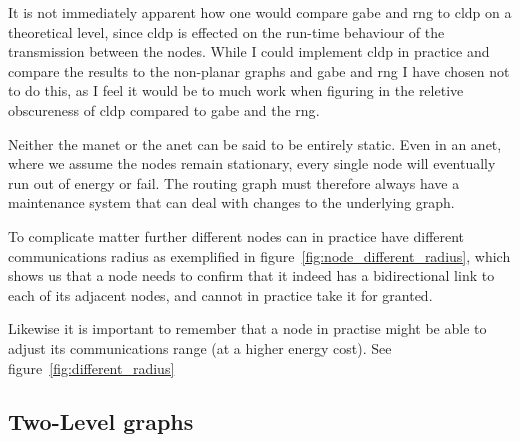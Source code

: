 
It is not immediately apparent how one would compare \ac{gabe} and \ac{rng} to \ac{cldp} on a theoretical level, since \ac{cldp} is effected on the run-time behaviour of the transmission between the nodes. While I could implement \ac{cldp} in practice and compare the results to the non-planar graphs and \ac{gabe} and \ac{rng} I have chosen not to do this, as I feel it would be to much work when figuring in the reletive obscureness of \ac{cldp} compared to \ac{gabe} and the \ac{rng}.  

Neither the \ac{manet} or the \ac{anet} can be said to be entirely static. Even in an \ac{anet}, where we assume the nodes remain stationary, every single node will eventually run out of energy or fail. The routing graph must therefore always have a maintenance system that can deal with changes to the underlying graph. 

To complicate matter further different nodes can in practice have different communications radius as exemplified in figure~\ref{fig:node_different_radius}, which shows us that a node needs to confirm that it indeed has a bidirectional link to each of its adjacent nodes, and cannot in practice take it for granted.


Likewise it is important to remember that a node in practise might be able to adjust its communications range (at a higher energy cost). See figure~\ref{fig:different_radius}

\subsection{Two-Level graphs}

